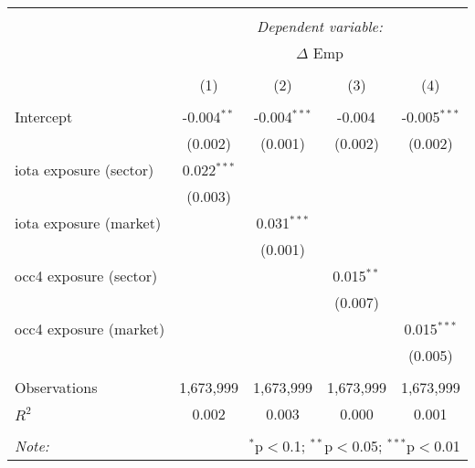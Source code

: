 \begin{tabular}{@{\extracolsep{5pt}}lcccc}
\\[-1.8ex]\hline
\hline \\[-1.8ex]
& \multicolumn{4}{c}{\textit{Dependent variable:}} \
\cr \cline{4-5}
\\[-1.8ex] & \multicolumn{4}{c}{$\Delta$ Emp}  \\
\\[-1.8ex] & (1) & (2) & (3) & (4) \\
\hline \\[-1.8ex]
 Intercept & -0.004$^{**}$ & -0.004$^{***}$ & -0.004$^{}$ & -0.005$^{***}$ \\
  & (0.002) & (0.001) & (0.002) & (0.002) \\
 iota exposure (sector) & 0.022$^{***}$ & & & \\
  & (0.003) & & & \\
 iota exposure (market) & & 0.031$^{***}$ & & \\
  & & (0.001) & & \\
 occ4 exposure (sector) & & & 0.015$^{**}$ & \\
  & & & (0.007) & \\
 occ4 exposure (market) & & & & 0.015$^{***}$ \\
  & & & & (0.005) \\
\hline \\[-1.8ex]
 Observations & 1,673,999 & 1,673,999 & 1,673,999 & 1,673,999 \\
 $R^2$ & 0.002 & 0.003 & 0.000 & 0.001 \\
\hline
\hline \\[-1.8ex]
\textit{Note:} & \multicolumn{4}{r}{$^{*}$p$<$0.1; $^{**}$p$<$0.05; $^{***}$p$<$0.01} \\
\end{tabular}